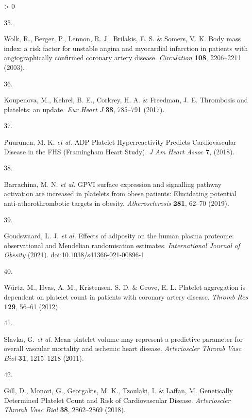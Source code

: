 \documentclass[11pt,twoside]{bristolthesis}
\newlength{\cslhangindent}
\newlength{\csllabelwidth}
\newenvironment{CSLReferences}[2] %
 {%
  \setlength{\parindent}{0pt}
  \ifodd #1 \everypar{\setlength{\hangindent}{\cslhangindent}}\ignorespaces\fi
  \ifnum #2 > 0
  \setlength{\parskip}{#2\baselineskip}
  \fi
 }%
 {}
\newcommand{\CSLLeftMargin}[1]{\parbox[t]{\csllabelwidth}{#1}}
\newcommand{\CSLRightInline}[1]{\parbox[t]{\linewidth - \csllabelwidth}{#1}\break}
\begin{document}
\begin{CSLReferences}{0}{0}
\leavevmode\hypertarget{ref-Wolk2003a}{}%
\CSLLeftMargin{35. }
\CSLRightInline{Wolk, R., Berger, P., Lennon, R. J., Brilakis, E. S. \& Somers, V. K. {Body mass index: a risk factor for unstable angina and myocardial infarction in patients with angiographically confirmed coronary artery disease}. \emph{Circulation} \textbf{108}, 2206--2211 (2003).}

\leavevmode\hypertarget{ref-Koupenova2017a}{}%
\CSLLeftMargin{36. }
\CSLRightInline{Koupenova, M., Kehrel, B. E., Corkrey, H. A. \& Freedman, J. E. {Thrombosis and platelets: an update}. \emph{Eur Heart J} \textbf{38}, 785--791 (2017).}

\leavevmode\hypertarget{ref-Puurunen2018}{}%
\CSLLeftMargin{37. }
\CSLRightInline{Puurunen, M. K. \emph{et al.} {ADP Platelet Hyperreactivity Predicts Cardiovascular Disease in the FHS (Framingham Heart Study)}. \emph{J Am Heart Assoc} \textbf{7}, (2018).}

\leavevmode\hypertarget{ref-Barrachina2019}{}%
\CSLLeftMargin{38. }
\CSLRightInline{Barrachina, M. N. \emph{et al.} {GPVI surface expression and signalling pathway activation are increased in platelets from obese patients: Elucidating potential anti-atherothrombotic targets in obesity}. \emph{Atherosclerosis} \textbf{281}, 62--70 (2019).}

\leavevmode\hypertarget{ref-Goudswaard2021}{}%
\CSLLeftMargin{39. }
\CSLRightInline{Goudswaard, L. J. \emph{et al.} {Effects of adiposity on the human plasma proteome: observational and Mendelian randomisation estimates}. \emph{International Journal of Obesity} (2021). doi:\href{https://doi.org/10.1038/s41366-021-00896-1}{10.1038/s41366-021-00896-1}}

\leavevmode\hypertarget{ref-Wurtz2012}{}%
\CSLLeftMargin{40. }
\CSLRightInline{Würtz, M., Hvas, A. M., Kristensen, S. D. \& Grove, E. L. {Platelet aggregation is dependent on platelet count in patients with coronary artery disease}. \emph{Thromb Res} \textbf{129}, 56--61 (2012).}

\leavevmode\hypertarget{ref-Slavka2011}{}%
\CSLLeftMargin{41. }
\CSLRightInline{Slavka, G. \emph{et al.} {Mean platelet volume may represent a predictive parameter for overall vascular mortality and ischemic heart disease}. \emph{Arterioscler Thromb Vasc Biol} \textbf{31}, 1215--1218 (2011).}

\leavevmode\hypertarget{ref-Gill2018}{}%
\CSLLeftMargin{42. }
\CSLRightInline{Gill, D., Monori, G., Georgakis, M. K., Tzoulaki, I. \& Laffan, M. {Genetically Determined Platelet Count and Risk of Cardiovascular Disease}. \emph{Arterioscler Thromb Vasc Biol} \textbf{38}, 2862--2869 (2018).}


\end{CSLReferences}
\end{document}
